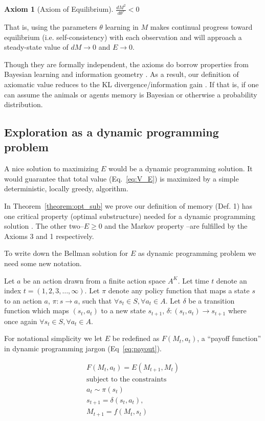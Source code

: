 \documentclass[10pt,letterpaper]{article}
\newtheorem{axiom}{Axiom}
\begin{document}
\begin{axiom}[Axiom of Equilibrium]
    $\frac{dM^2}{d\theta^s} < 0$
    \label{ax:5}
\end{axiom}
\noindent
That is, using the parameters $\theta$ learning in $M$ makes continual progress toward equilibrium (i.e. self-consistency) with each observation and will approach a steady-state value of $dM \rightarrow 0$ and $E \rightarrow 0$.

Though they are formally independent, the axioms do borrow properties from Bayesian learning and information geometry \cite{Friston2016,Harper2009,Ly2017,Itti2009}. As a result, our definition of axiomatic value reduces to the KL divergence/information gain \cite{MacKay2003,Ly2017}. If that is, if one can assume the animals or agents memory is Bayesian or otherwise a probability distribution.

\subsection{Exploration as a dynamic programming problem}
A nice solution to maximizing $E$ would be a dynamic programming solution. It would guarantee that total value (Eq.~\ref{eq:V_E}) is maximized by a simple deterministic, locally greedy, algorithm. 

In Theorem~\ref{theorem:opt_sub} we prove our definition of memory (Def. 1) has one critical property (optimal substructure) needed for a dynamic programming solution \cite{Roughgarden2019}. The other two--$E\ge0$ and the Markov property \cite{Sutton2018}--are fulfilled by the Axioms 3 and 1 respectively. 

To write down the Bellman solution for $E$ as dynamic programming problem we need some new notation. 

Let $a$ be an action drawn from a finite action space $A^K$. Let time $t$ denote an index $t = (1,2,3,\ldots,\infty)$. Let $\pi$ denote any policy function that maps a state $s$ to an action $a$, $\pi : s \rightarrow a$, such that $\forall s_t \in S, \forall a_t \in A$. Let $\delta$ be a transition function which maps $(s_{t},a_t)$ to a new state $s_{t+1}$, $\delta : (s_{t}, a_t) \rightarrow s_{t+1}$ where once again $\forall s_t \in S, \forall a_t \in A$.

For notational simplicity we let $E$ be redefined as $F(M_{t}, a_t)$, a ``payoff function'' in dynamic programming jargon (Eq~\ref{eq:payout}). 

\begin{equation}
    \begin{split} \label{eq:payout}
    F(M_{t}, a_t) = E(M_{t+1}, M_{t})\\
    \text{subject to the constraints} \\
    a_{t} \sim \pi(s_t) \\
    s_{t+1} = \delta(s_{t}, a_t),\\ 
    M_{t+1} = f(M_{t}, s_{t})
    \end{split} 
\end{equation}
\end{document}
